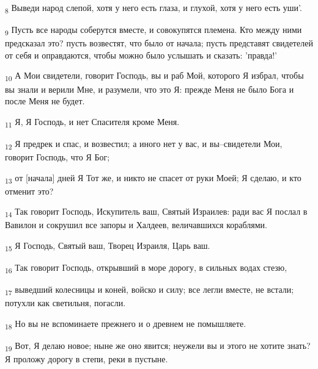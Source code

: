 \begin{tcolorbox}
\textsubscript{8} Выведи народ слепой, хотя у него есть глаза, и глухой, хотя у него есть уши'.
\end{tcolorbox}
\begin{tcolorbox}
\textsubscript{9} Пусть все народы соберутся вместе, и совокупятся племена. Кто между ними предсказал это? пусть возвестят, что было от начала; пусть представят свидетелей от себя и оправдаются, чтобы можно было услышать и сказать: 'правда!'
\end{tcolorbox}
\begin{tcolorbox}
\textsubscript{10} А Мои свидетели, говорит Господь, вы и раб Мой, которого Я избрал, чтобы вы знали и верили Мне, и разумели, что это Я: прежде Меня не было Бога и после Меня не будет.
\end{tcolorbox}
\begin{tcolorbox}
\textsubscript{11} Я, Я Господь, и нет Спасителя кроме Меня.
\end{tcolorbox}
\begin{tcolorbox}
\textsubscript{12} Я предрек и спас, и возвестил; а иного нет у вас, и вы--свидетели Мои, говорит Господь, что Я Бог;
\end{tcolorbox}
\begin{tcolorbox}
\textsubscript{13} от [начала] дней Я Тот же, и никто не спасет от руки Моей; Я сделаю, и кто отменит это?
\end{tcolorbox}
\begin{tcolorbox}
\textsubscript{14} Так говорит Господь, Искупитель ваш, Святый Израилев: ради вас Я послал в Вавилон и сокрушил все запоры и Халдеев, величавшихся кораблями.
\end{tcolorbox}
\begin{tcolorbox}
\textsubscript{15} Я Господь, Святый ваш, Творец Израиля, Царь ваш.
\end{tcolorbox}
\begin{tcolorbox}
\textsubscript{16} Так говорит Господь, открывший в море дорогу, в сильных водах стезю,
\end{tcolorbox}
\begin{tcolorbox}
\textsubscript{17} выведший колесницы и коней, войско и силу; все легли вместе, не встали; потухли как светильня, погасли.
\end{tcolorbox}
\begin{tcolorbox}
\textsubscript{18} Но вы не вспоминаете прежнего и о древнем не помышляете.
\end{tcolorbox}
\begin{tcolorbox}
\textsubscript{19} Вот, Я делаю новое; ныне же оно явится; неужели вы и этого не хотите знать? Я проложу дорогу в степи, реки в пустыне.
\end{tcolorbox}

